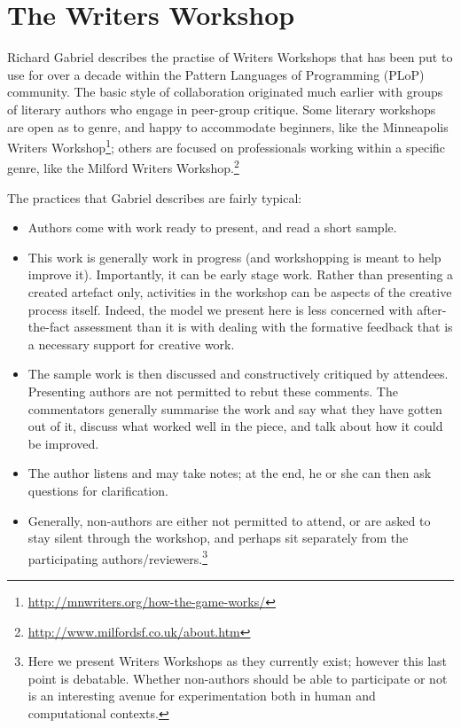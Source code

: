 \section{The Writers Workshop} \label{sec:writers-workshop}

Richard Gabriel \citeyear{gabriel2002writer} describes the practise of
Writers Workshops that has been put to use for over a decade within
the Pattern Languages of Programming (PLoP) community.  The basic
style of collaboration originated much earlier with groups of literary
authors who engage in peer-group critique.  Some literary workshops
are open as to genre, and happy to accommodate beginners, like the
Minneapolis Writers
Workshop\footnote{\url{http://mnwriters.org/how-the-game-works/}};
others are focused on professionals working within a specific genre,
like the Milford Writers
Workshop.\footnote{\url{http://www.milfordsf.co.uk/about.htm}}

The
practices that Gabriel describes are fairly typical:  
\begin{itemize}
\item Authors come with work ready to present, and read a short
  sample.
\item This work is generally work in progress (and workshopping is
  meant to help improve it).  Importantly, it can be early stage work.
  Rather than presenting a created artefact only, activities in the
  workshop can be aspects of the creative process itself.  Indeed, the
  model we present here is less concerned with after-the-fact
  assessment than it is with dealing with the formative feedback that
  is a necessary support for creative work.
\item The sample work is then
discussed and constructively critiqued by attendees.  Presenting
authors are not permitted to rebut these comments.  The commentators
generally summarise the work and say what they have gotten out of it,
discuss what worked well in the piece, and talk about how it could be
improved.  
\item The author listens and may take notes; at the end, he or
she can then ask questions for clarification.  
\item Generally, non-authors
are either not permitted to attend, or are asked to stay silent
through the workshop, and perhaps sit separately from the
participating authors/reviewers.\footnote{Here we present Writers Workshops as they currently exist; however this last point is debatable. Whether non-authors should be able to participate or not is an interesting avenue for experimentation both in human and computational contexts.}
\end{itemize}

